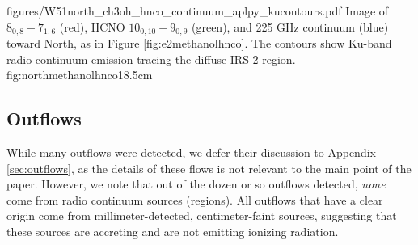 \documentclass{emulateapj}
\begin{document}
\Figure
{figures/W51north_ch3oh_hnco_continuum_aplpy_kucontours.pdf}
{Image of \methanol $8_{0,8}-7_{1,6}$ (red), HCNO $10_{0,10}-9_{0,9}$ (green),
and 225 GHz continuum (blue) toward  North, as in Figure
\ref{fig:e2methanolhnco}.  The contours show Ku-band radio continuum emission
tracing the diffuse IRS 2 \hii region.}
{fig:northmethanolhnco}{1}{8.5cm}

\subsection{Outflows}
\label{sec:mainoutflows}
While many outflows were detected, we defer their discussion to Appendix
\ref{sec:outflows}, as the details of these flows is not relevant to the main
point of the paper.  However, we note that out of the dozen or so outflows
detected, \emph{none} come from radio continuum sources (\hii regions).  All
outflows that have a clear origin come from millimeter-detected,
centimeter-faint sources, suggesting that these sources are accreting and are
not emitting ionizing radiation.








\end{document}
